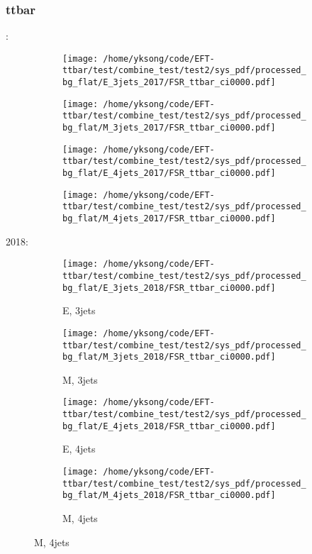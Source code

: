\documentclass{beamer}
\begin{document}
\begin{frame}
\frametitle{ttbar}
\fontsize{5}{1}:
\begin{figure}
\centering
\begin{subfigure}[b]{0.24\textwidth}
\texttt{[image: /home/yksong/code/EFT-ttbar/test/combine\_test/test2/sys\_pdf/processed\_bg\_flat/E\_3jets\_2017/FSR\_ttbar\_ci0000.pdf]}
\end{subfigure}
\begin{subfigure}[b]{0.24\textwidth}
\texttt{[image: /home/yksong/code/EFT-ttbar/test/combine\_test/test2/sys\_pdf/processed\_bg\_flat/M\_3jets\_2017/FSR\_ttbar\_ci0000.pdf]}
\end{subfigure}
\begin{subfigure}[b]{0.24\textwidth}
\texttt{[image: /home/yksong/code/EFT-ttbar/test/combine\_test/test2/sys\_pdf/processed\_bg\_flat/E\_4jets\_2017/FSR\_ttbar\_ci0000.pdf]}
\end{subfigure}
\begin{subfigure}[b]{0.24\textwidth}
\texttt{[image: /home/yksong/code/EFT-ttbar/test/combine\_test/test2/sys\_pdf/processed\_bg\_flat/M\_4jets\_2017/FSR\_ttbar\_ci0000.pdf]}
\end{subfigure}
\end{figure}
2018:
\begin{figure}
\centering
\begin{subfigure}[b]{0.24\textwidth}
\texttt{[image: /home/yksong/code/EFT-ttbar/test/combine\_test/test2/sys\_pdf/processed\_bg\_flat/E\_3jets\_2018/FSR\_ttbar\_ci0000.pdf]}
\captionsetup{font=tiny}
\caption{E, 3jets}
\end{subfigure}
\begin{subfigure}[b]{0.24\textwidth}
\texttt{[image: /home/yksong/code/EFT-ttbar/test/combine\_test/test2/sys\_pdf/processed\_bg\_flat/M\_3jets\_2018/FSR\_ttbar\_ci0000.pdf]}
\captionsetup{font=tiny}
\caption{M, 3jets}
\end{subfigure}
\begin{subfigure}[b]{0.24\textwidth}
\texttt{[image: /home/yksong/code/EFT-ttbar/test/combine\_test/test2/sys\_pdf/processed\_bg\_flat/E\_4jets\_2018/FSR\_ttbar\_ci0000.pdf]}
\captionsetup{font=tiny}
\caption{E, 4jets}
\end{subfigure}
\begin{subfigure}[b]{0.24\textwidth}
\texttt{[image: /home/yksong/code/EFT-ttbar/test/combine\_test/test2/sys\_pdf/processed\_bg\_flat/M\_4jets\_2018/FSR\_ttbar\_ci0000.pdf]}
\captionsetup{font=tiny}
\caption{M, 4jets}
\end{subfigure}
\end{figure}
\end{frame}
\end{document}
